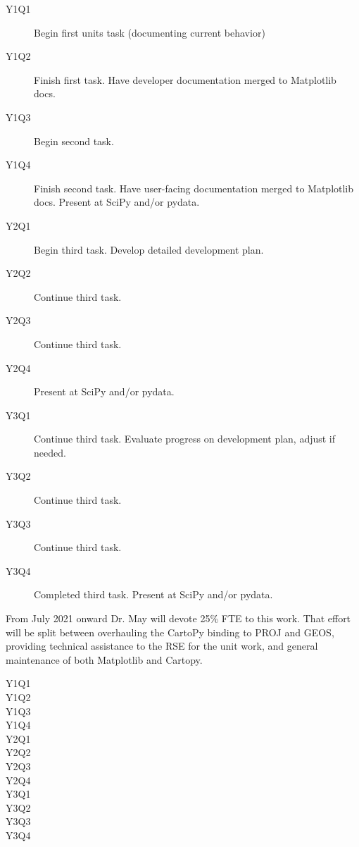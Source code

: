 \documentclass[12pt]{article}
\numberwithin{page}{section}
\begin{document}
\begin{description}

\item[Y1Q1] Begin first units task (documenting current behavior)
\item[Y1Q2] Finish first task. Have developer documentation merged to
  Matplotlib docs.
\item[Y1Q3] Begin second task.
\item[Y1Q4] Finish second task. Have user-facing documentation merged
  to Matplotlib docs. Present at SciPy and/or pydata.

\item[Y2Q1] Begin third task.  Develop detailed development plan.
\item[Y2Q2] Continue third task.
\item[Y2Q3] Continue third task.
\item[Y2Q4] Present at SciPy and/or pydata.


\item[Y3Q1] Continue third task. Evaluate progress on development
  plan, adjust if needed.
\item[Y3Q2] Continue third task.
\item[Y3Q3] Continue third task.
\item[Y3Q4] Completed third task. Present at SciPy and/or pydata.

\end{description}

From July 2021 onward Dr. May will devote 25\% FTE to this work.  That
effort will be split between overhauling the CartoPy binding to PROJ
and GEOS, providing technical assistance to the RSE for the unit work,
and general maintenance of both Matplotlib and Cartopy.


\begin{description}

\item[Y1Q1]
\item[Y1Q2]
\item[Y1Q3]
\item[Y1Q4]

\item[Y2Q1]
\item[Y2Q2]
\item[Y2Q3]
\item[Y2Q4]


\item[Y3Q1]
\item[Y3Q2]
\item[Y3Q3]
\item[Y3Q4]

\end{description}
\end{document}

